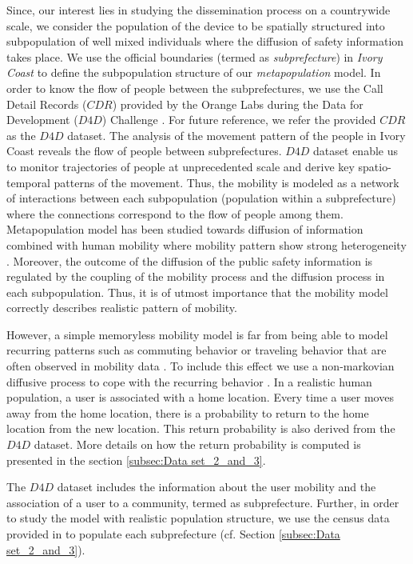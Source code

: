 \documentclass[review]{elsarticle}
\begin{document}
Since, our interest lies in studying the dissemination process on a countrywide scale, we consider the population of the device to be spatially structured into subpopulation of well mixed individuals where the diffusion of safety information takes place. We use the official boundaries (termed as \emph{subprefecture}) in \emph{Ivory Coast} to define the subpopulation structure of our \emph{metapopulation} model. In order to know the flow of people between the subprefectures, we use the Call Detail Records ($CDR$) provided by the Orange Labs during the Data for Development ($D4D$) Challenge \cite{Blondel2012}. For future reference, we refer the provided $CDR$ as the $D4D$ dataset. The analysis of the movement pattern of the people in Ivory Coast reveals the flow of people between subprefectures. $D4D$ dataset enable us to monitor trajectories of people at unprecedented scale and derive key spatio-temporal patterns of the movement. Thus, the mobility is modeled as a network of interactions between each subpopulation (population within a subprefecture) where the connections correspond to the flow of people among them. Metapopulation\cite{Arino2006, Watts2005} model has been studied towards diffusion of information combined with human mobility where mobility pattern show strong heterogeneity \cite{gonzálezunderstanding2008, brockmannthe2006, colizzaepidemic2008}. Moreover, the outcome of the diffusion of the public safety information is regulated by the coupling of the mobility process and the diffusion process in each subpopulation. Thus, it is of utmost importance that the mobility model correctly describes realistic pattern of mobility.

However, a simple memoryless mobility model is far from being able to model recurring patterns such as commuting behavior or traveling behavior that are often observed in mobility data \cite{gonzálezunderstanding2008, songlimits2010}. To include this effect we use a non-markovian diffusive process to cope with the recurring behavior \cite{balcanphase2011, polettoheterogeneous2012}. In a realistic human population, a user is associated with a home location. Every time a user moves away from the home location, there is a probability to return to the home location from the new location. This return probability is also derived from the $D4D$ dataset. More details on how the return probability is computed is presented in the section \ref{subsec:Data set_2_and_3}.

The $D4D$ dataset includes the information about the user mobility and the association of a user to a community, termed as subprefecture. Further, in order to study the model with realistic population structure, we use the census data provided in \cite{Web1} to populate each subprefecture (cf. Section \ref{subsec:Data set_2_and_3}).
\end{document}

